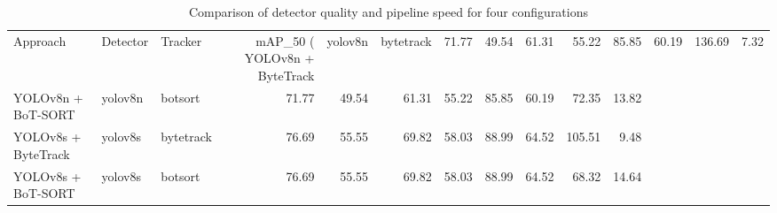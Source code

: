 \begin{table}
\caption{Comparison of detector quality and pipeline speed for four configurations}
\label{tab:models_comparison_test}
\begin{tabular}{lllrrrrrrrr}
\toprule
Approach & Detector & Tracker & mAP_50 (%
\midrule
YOLOv8n + ByteTrack & yolov8n & bytetrack & 71.77 & 49.54 & 61.31 & 55.22 & 85.85 & 60.19 & 136.69 & 7.32 \\
YOLOv8n + BoT-SORT & yolov8n & botsort & 71.77 & 49.54 & 61.31 & 55.22 & 85.85 & 60.19 & 72.35 & 13.82 \\
YOLOv8s + ByteTrack & yolov8s & bytetrack & 76.69 & 55.55 & 69.82 & 58.03 & 88.99 & 64.52 & 105.51 & 9.48 \\
YOLOv8s + BoT-SORT & yolov8s & botsort & 76.69 & 55.55 & 69.82 & 58.03 & 88.99 & 64.52 & 68.32 & 14.64 \\
\bottomrule
\end{tabular}
\end{table}
